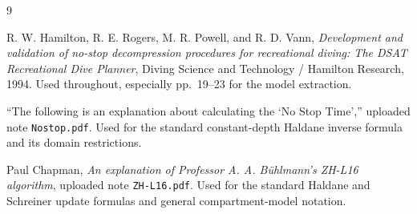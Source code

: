 \documentclass[11pt]{article}
\begin{document}
\begin{thebibliography}{9}

R. W. Hamilton, R. E. Rogers, M. R. Powell, and R. D. Vann,
\emph{Development and validation of no-stop decompression procedures for recreational diving: The DSAT Recreational Dive Planner},
Diving Science and Technology / Hamilton Research, 1994.
Used throughout, especially pp.~19--23 for the model extraction.

``The following is an explanation about calculating the `No Stop Time',''
uploaded note \texttt{Nostop.pdf}.
Used for the standard constant-depth Haldane inverse formula and its domain restrictions.

Paul Chapman,
\emph{An explanation of Professor A. A. B{\"u}hlmann's ZH-L16 algorithm},
uploaded note \texttt{ZH-L16.pdf}.
Used for the standard Haldane and Schreiner update formulas and general compartment-model notation.

\end{thebibliography}
\end{document}
